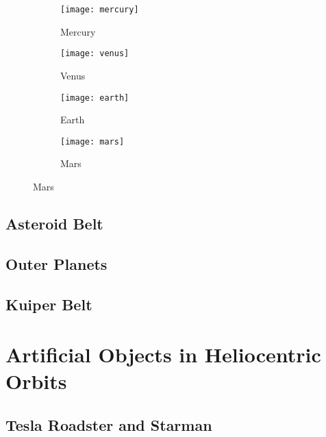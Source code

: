 \lipsum[5]

\begin{figure}[p]
    \caption[Inner Planets of the Solar System]{{\bf Inner Planets of the Solar System}}
    \begin{subfigure}[b]{0.5\textwidth}
        \centering
        \texttt{[image: mercury]}
        \caption{Mercury}
    \end{subfigure}%
    \begin{subfigure}[b]{0.5\textwidth}
        \centering
        \texttt{[image: venus]}
        \caption{Venus}
    \end{subfigure}
    \subfigurerow
    \begin{subfigure}[b]{0.5\textwidth}
        \centering
        \texttt{[image: earth]}
        \caption{Earth}
    \end{subfigure}%
    \begin{subfigure}[b]{0.5\textwidth}
        \centering
        \texttt{[image: mars]}
        \caption{Mars}
    \end{subfigure}
\end{figure}

\subsection{Asteroid Belt}

\lipsum[6]

\subsection{Outer Planets}

\lipsum[7]

\subsection{Kuiper Belt}

\lipsum[8]

\section{Artificial Objects in Heliocentric Orbits}

\lipsum[9]

\subsection{Tesla Roadster and Starman}

